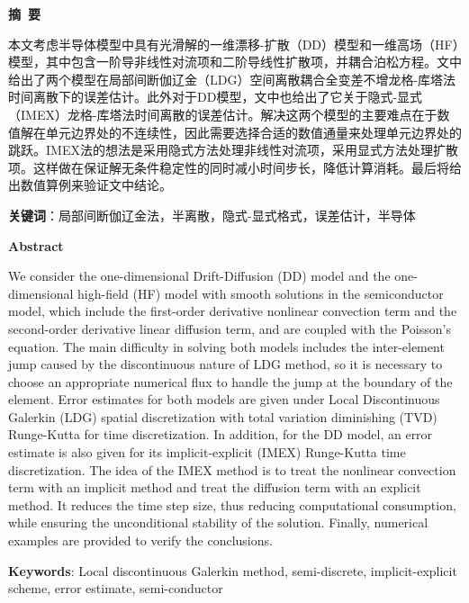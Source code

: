 \cleardoublepage{}
\begin{center}
    \bfseries {} 摘~要
\end{center}
本文考虑半导体模型中具有光滑解的一维漂移-扩散（DD）模型和一维高场（HF）模型，其中包含一阶导非线性对流项和二阶导线性扩散项，并耦合泊松方程。文中给出了两个模型在局部间断伽辽金（LDG）空间离散耦合全变差不增龙格-库塔法时间离散下的误差估计。此外对于DD模型，文中也给出了它关于隐式-显式（IMEX）龙格-库塔法时间离散的误差估计。解决这两个模型的主要难点在于数值解在单元边界处的不连续性，因此需要选择合适的数值通量来处理单元边界处的跳跃。IMEX法的想法是采用隐式方法处理非线性对流项，采用显式方法处理扩散项。这样做在保证解无条件稳定性的同时减小时间步长，降低计算消耗。最后将给出数值算例来验证文中结论。

\noindent \textbf{关键词}：局部间断伽辽金法，半离散，隐式-显式格式，误差估计，半导体
\cleardoublepage{}
\begin{center}
    \bfseries {} Abstract
\end{center}
We consider the one-dimensional Drift-Diffusion (DD) model and the one-dimensional high-field (HF) model with smooth solutions in the semiconductor model, which include the first-order derivative nonlinear convection term and the second-order derivative linear diffusion term, and are coupled with the Poisson's equation. The main difficulty in solving both models includes the inter-element jump caused by the discontinuous nature of LDG method, so it is necessary to choose an appropriate numerical flux to handle the jump at the boundary of the element. Error estimates for both models are given under Local Discontinuous Galerkin (LDG) spatial discretization with total variation diminishing (TVD) Runge-Kutta for time discretization. In addition, for the DD model, an error estimate is also given for its implicit-explicit (IMEX) Runge-Kutta time discretization. The idea of the IMEX method is to treat the nonlinear convection term with an implicit method and treat the diffusion term with an explicit method. It reduces the time step size, thus reducing computational consumption, while ensuring the unconditional stability of the solution. Finally, numerical examples are provided to verify the conclusions.

\noindent \textbf{Keywords}: Local discontinuous Galerkin method, semi-discrete, implicit-explicit scheme, error estimate, semi-conductor